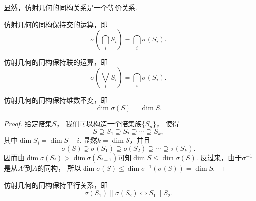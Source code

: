 显然，仿射几何的同构关系是一个等价关系.

\begin{property}
仿射几何的同构保持交的运算，即\begin{equation*}
	\sigma\left( \bigcap_i S_i \right)
	= \bigcap_i \sigma(S_i).
\end{equation*}
\end{property}

\begin{property}
仿射几何的同构保持联的运算，即\begin{equation*}
	\sigma\left( \bigvee_i S_i \right)
	= \bigcap_i \sigma(S_i).
\end{equation*}
\end{property}

\begin{property}
仿射几何的同构保持维数不变，即\begin{equation*}
	\dim\sigma(S) = \dim S.
\end{equation*}
\begin{proof}
给定陪集\(S\)，
我们可以构造一个陪集族\(\{S_n\}\)，
使得\begin{equation}
	S \supseteq S_1 \supseteq S_2 \supseteq \dotsb \supseteq S_k,
\end{equation}
其中\(\dim S_i = \dim S - i\).
显然\(k = \dim S\)，并且\begin{equation*}
	\sigma(S) \supseteq \sigma(S_1) \supseteq \sigma(S_2) \supseteq \dotsb \supseteq \sigma(S_k).
\end{equation*}
因而由\(\dim \sigma(S_i) > \dim \sigma(S_{i+1})\)可知\(\dim S \leq \dim \sigma(S)\).
反过来，由于\(\sigma^{-1}\)是从\(A'\)到\(A\)的同构，
所以\(
	\dim \sigma(S) \leq \dim \sigma^{-1}(\sigma(S)) = \dim S.
\)
\end{proof}
\end{property}

\begin{property}
仿射几何的同构保持平行关系，即\begin{equation*}
	\sigma(S_1) \parallel \sigma(S_2)
	\iff
	S_1 \parallel S_2.
\end{equation*}
\end{property}


